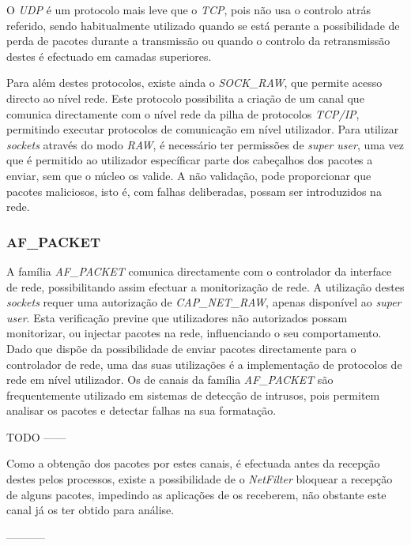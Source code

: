 O \textit{UDP} é um protocolo mais leve que o \textit{TCP}, pois não usa o controlo atrás referido, sendo habitualmente utilizado quando se está perante a possibilidade de perda de pacotes durante a transmissão ou quando o controlo da retransmissão destes é efectuado em camadas superiores.

Para além destes protocolos, existe ainda o \textit{SOCK\_RAW}, que permite acesso directo ao nível rede.
Este protocolo possibilita a criação de um canal que comunica directamente com o nível rede da pilha de protocolos \textit{TCP/IP}, permitindo executar protocolos de comunicação em nível utilizador.
Para utilizar \textit{sockets} através do modo \textit{RAW}, é necessário ter permissões de \textit{super user}, uma vez que é permitido ao utilizador específicar parte dos cabeçalhos dos pacotes a enviar, sem que o núcleo os valide.
A não validação, pode proporcionar que pacotes maliciosos, isto é, com falhas deliberadas, possam ser introduzidos na rede.
 


\subsubsection{AF\_PACKET}
\label{subsub:af_packet}

A família \textit{AF\_PACKET} comunica directamente com o controlador da interface de rede, possibilitando assim efectuar a monitorização de rede.
A utilização destes \textit{sockets} requer uma autorização de \textit{CAP\_NET\_RAW}, apenas disponível ao \textit{super user}.
Esta verificação previne que utilizadores não autorizados possam monitorizar, ou injectar pacotes na rede, influenciando o seu comportamento.
Dado que dispõe da possibilidade de enviar pacotes directamente para o controlador de rede, uma das suas utilizações é a implementação de protocolos de rede em nível utilizador.
Os de canais da família \textit{AF\_PACKET} são frequentemente utilizado em sistemas de detecção de intrusos, pois permitem analisar os pacotes e detectar falhas na sua formatação.

TODO ------

Como a obtenção dos pacotes por estes canais, é efectuada antes da recepção destes pelos processos, existe a possibilidade de o \textit{NetFilter} bloquear a recepção de alguns pacotes, impedindo as aplicações de os receberem, não obstante este canal já os ter obtido para análise.

-----------


 
